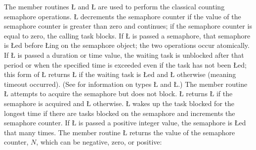 \documentclass[openright,twoside]{report}
\begin{document}
The member routines \LGinlinetrue\LGbegin\lgrinde\L{}\endlgrinde\LGend{} and \LGinlinetrue\LGbegin\lgrinde\L{}\endlgrinde\LGend{} are used to perform the classical counting semaphore operations.
\LGinlinetrue\LGbegin\lgrinde\L{}\endlgrinde\LGend{} decrements the semaphore counter if the value of the semaphore counter is greater than zero and continues;
if the semaphore counter is equal to zero, the calling task blocks.
If \LGinlinetrue\LGbegin\lgrinde\L{}\endlgrinde\LGend{} is passed a semaphore, that semaphore is \LGinlinetrue\LGbegin\lgrinde\L{}\endlgrinde\LGend{}ed before \LGinlinetrue\LGbegin\lgrinde\L{}\endlgrinde\LGend{}ing on the semaphore object;
the two operations occur atomically.
If \LGinlinetrue\LGbegin\lgrinde\L{}\endlgrinde\LGend{} is passed a duration or time value, the waiting task is unblocked after that period or when the specified time is exceeded even if the task has not been \LGinlinetrue\LGbegin\lgrinde\L{}\endlgrinde\LGend{}ed;
this form of \LGinlinetrue\LGbegin\lgrinde\L{}\endlgrinde\LGend{} returns \LGinlinetrue\LGbegin\lgrinde\L{}\endlgrinde\LGend{} if the waiting task is \LGinlinetrue\LGbegin\lgrinde\L{}\endlgrinde\LGend{}ed and \LGinlinetrue\LGbegin\lgrinde\L{}\endlgrinde\LGend{} otherwise (meaning timeout occurred).
(See  for information on types \LGinlinetrue\LGbegin\lgrinde\L{}\endlgrinde\LGend{} and \LGinlinetrue\LGbegin\lgrinde\L{}\endlgrinde\LGend{}.)
The member routine \LGinlinetrue\LGbegin\lgrinde\L{}\endlgrinde\LGend{} attempts to acquire the semaphore but does not block.
\LGinlinetrue\LGbegin\lgrinde\L{}\endlgrinde\LGend{} returns \LGinlinetrue\LGbegin\lgrinde\L{}\endlgrinde\LGend{} if the semaphore is acquired and \LGinlinetrue\LGbegin\lgrinde\L{}\endlgrinde\LGend{} otherwise.
\LGinlinetrue\LGbegin\lgrinde\L{}\endlgrinde\LGend{} wakes up the task blocked for the longest time if there are tasks blocked on the semaphore and increments the semaphore counter.
If \LGinlinetrue\LGbegin\lgrinde\L{}\endlgrinde\LGend{} is passed a positive integer value, the semaphore is \LGinlinetrue\LGbegin\lgrinde\L{}\endlgrinde\LGend{}ed that many times.
The member routine \LGinlinetrue\LGbegin\lgrinde\L{}\endlgrinde\LGend{} returns the value of the semaphore counter, $N$, which can be negative, zero, or positive:
\end{document}
